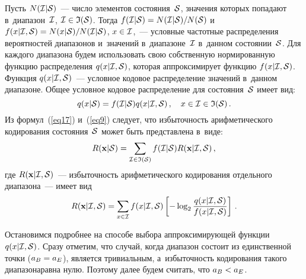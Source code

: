 \begin{multicols}{2}
Пусть $N({\cal I}|{\cal S})$~--- число элементов состояния~${\cal S}$, 
значения которых попадают в~диапазон~${\cal I}$, ${\cal I}\hm\in{\frak I}({\cal S})$. 
Тогда $f({\cal I}|{\cal S})\hm=N({\cal I}|{\cal S})/N({\cal S})$ 
и~$f(x|{\cal I},{\cal S})\hm=N({x|\cal S})/N({\cal I}|{\cal S})$,  $x\hm\in{\cal I}$,~--- 
условные частотные распределения вероятностей диапазонов и~значений 
в~диапазоне~${\cal I}$ в~данном состоянии~${\cal S}$. Для каждого диапазона 
будем использовать свою собственную нормированную функцию 
распределения $q(x|{\cal I},{\cal S})$, которая аппроксимирует 
функцию $f(x|{\cal I},{\cal S})$. Функция $q(x|{\cal I},{\cal S})$~--- 
условное кодовое распределение значений в~данном диапазоне. Общее условное 
кодовое распределение для со\-сто\-яния~${\cal S}$   имеет вид:
\begin{equation}
\label{eq17}
q(x|{\cal S}) = f({\cal I}|{\cal S}) q(x|{\cal I},{\cal S})\,, 
\quad x\in{\cal I}\in{\frak I({\cal S})}\,.
\end{equation}
Из формул~(\ref{eq17}) и~(\ref{eq9}) следует, что избыточность 
арифметического кодирования состояния~${\cal S}$ может быть представлена в~виде:
\begin{equation}
\label{eq18}
R(\mathbf{x}|{\cal S}) =
\sum\limits_{{\cal I}\in{\frak I}({\cal S})} f({\cal I}|{\cal S}) 
R(\mathbf{x}|{\cal I},{\cal S})\,,
\end{equation}
где $R(\mathbf{x}|{\cal I},{\cal S})$~--- избыточность арифметического 
кодирования отдельного диапазона~--- имеет вид
\begin{equation}
\label{eq19}
R(\mathbf{x}|{\cal I},{\cal S}) = \sum\limits_{x\in{\cal I}} f(x|{\cal I},{\cal S})
\left[ -\log_{2}\displaystyle\frac{\displaystyle q(x|{\cal I},{\cal S})\mathstrut}{\displaystyle f(x|{\cal I},{\cal S})\mathstrut}\right]\,.
\end{equation}

Остановимся подробнее на способе выбора аппроксимирующей функции 
$q(x|{\cal I},{\cal S})$. Сразу отметим, что случай, когда диапазон 
состоит из единственной точки ($a_B\hm=a_E$), является тривиальным,\linebreak
 а~избыточность 
кодирования такого диапазона\linebreak равна нулю. Поэтому далее будем считать, 
что $a_B\hm<a_E$. 


\end{multicols}
